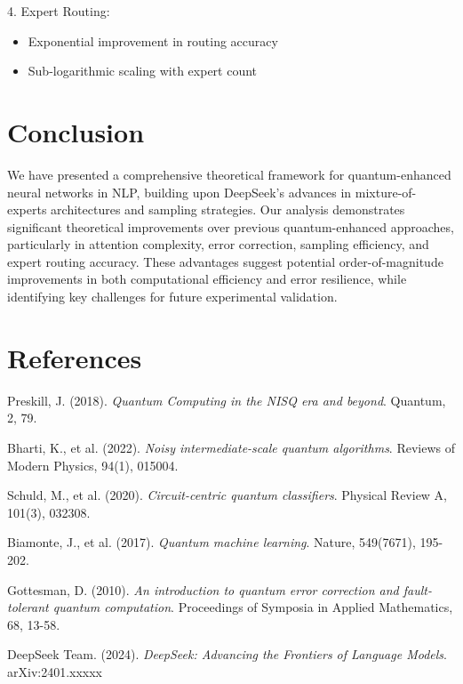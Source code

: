 \documentclass{article}
\begin{document}
4. Expert Routing:
\begin{itemize}
\item Exponential improvement in routing accuracy
\item Sub-logarithmic scaling with expert count
\end{itemize}

\section{Conclusion}
We have presented a comprehensive theoretical framework for quantum-enhanced neural networks in NLP, building upon DeepSeek's advances in mixture-of-experts architectures and sampling strategies. Our analysis demonstrates significant theoretical improvements over previous quantum-enhanced approaches, particularly in attention complexity, error correction, sampling efficiency, and expert routing accuracy. These advantages suggest potential order-of-magnitude improvements in both computational efficiency and error resilience, while identifying key challenges for future experimental validation.

\section{References}
\begin{thebibliography}{9}

Preskill, J. (2018).
\textit{Quantum Computing in the NISQ era and beyond}.
Quantum, 2, 79.

Bharti, K., et al. (2022).
\textit{Noisy intermediate-scale quantum algorithms}.
Reviews of Modern Physics, 94(1), 015004.

Schuld, M., et al. (2020).
\textit{Circuit-centric quantum classifiers}.
Physical Review A, 101(3), 032308.

Biamonte, J., et al. (2017).
\textit{Quantum machine learning}.
Nature, 549(7671), 195-202.

Gottesman, D. (2010).
\textit{An introduction to quantum error correction and fault-tolerant quantum computation}.
Proceedings of Symposia in Applied Mathematics, 68, 13-58.

DeepSeek Team. (2024).
\textit{DeepSeek: Advancing the Frontiers of Language Models}.
arXiv:2401.xxxxx

\end{thebibliography}
\end{document}
